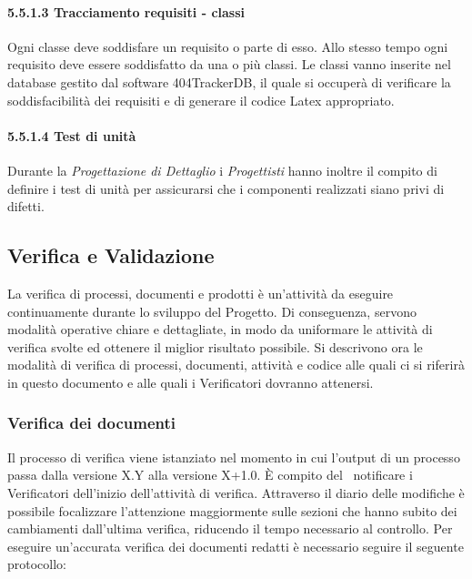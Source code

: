 \paragraph{5.5.1.3 Tracciamento requisiti - classi \\}
Ogni classe deve soddisfare un requisito o parte di esso. Allo stesso tempo ogni requisito deve essere soddisfatto da una o più classi.
Le classi vanno inserite nel database gestito dal software 404TrackerDB, il quale si occuperà di verificare la soddisfacibilità dei requisiti e di generare il codice {Latex} appropriato.

\paragraph{5.5.1.4 Test di unità \\}
Durante la \textit{Progettazione di Dettaglio} i \textit{Progettisti} hanno inoltre il compito di definire i test di unità per assicurarsi che i componenti realizzati siano privi di difetti.

\subsection{Verifica e Validazione}

La verifica di processi, documenti e prodotti è un'attività da eseguire continuamente
durante lo sviluppo del Progetto. Di conseguenza, servono modalità operative chiare
e dettagliate, in modo da uniformare le attività di verifica svolte ed
ottenere il miglior risultato possibile. Si descrivono ora le modalità di verifica di processi, documenti, attività e codice alle quali ci si riferirà in questo
documento e alle quali i Verificatori dovranno attenersi.

\subsubsection{Verifica dei documenti}
Il processo di verifica viene istanziato nel momento in cui l'output di un processo passa
dalla versione X.Y alla versione X+1.0. È compito del \ruoloResponsabile\ notificare i Verificatori dell'inizio dell'attività di verifica. Attraverso il diario delle modifiche è
possibile focalizzare l'attenzione maggiormente sulle sezioni che hanno subito dei cambiamenti dall'ultima verifica, riducendo il tempo necessario al controllo.
Per eseguire un'accurata verifica dei documenti redatti è necessario seguire il seguente
protocollo:

